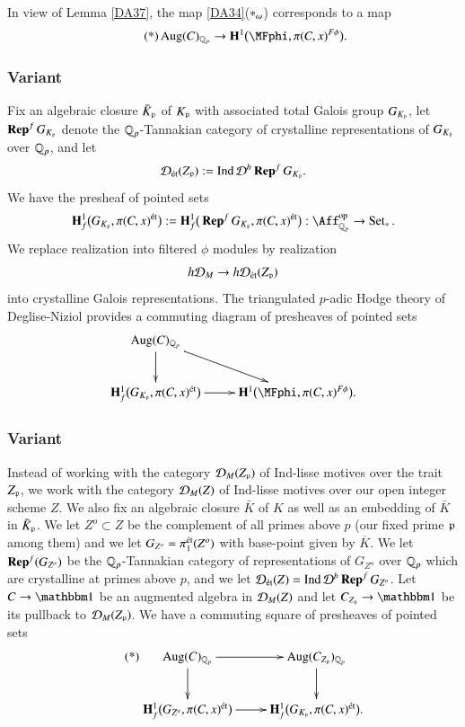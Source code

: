 \begin{ssRemark}
\label{DA38}
In view of Lemma \ref{DA37}, the map \ref{DA34}($\ast_\omega$) corresponds to a map
\[
\tag{*}
\Aug(C)_\Qp \to 
\mathbf{H}^1\big(\MFphi, \pi(C,x)^{F\phi} \big).
\]
\end{ssRemark}

\subsubsection{Variant}
\label{DA39}
Fix an algebraic closure $\bar K_{\mathfrak{p}}$ of $K_{\mathfrak{p}}$ with associated total Galois group $G_{K_{\mathfrak{p}}}$, let $\operatorname{\bf{Rep}}^f G_{K_{\mathfrak{p}}}$ denote the ${\mathbb{Q}_p}$-Tannakian category of crystalline representations of $G_{K_{\mathfrak{p}}}$ over ${\mathbb{Q}_p}$, and let
\[
\mathcal{D}_{\textrm {\'et}}(Z_{\mathfrak{p}}) := \operatorname{Ind} \mathcal{D}^b \operatorname{\bf{Rep}}^f G_{K_{\mathfrak{p}}}.
\]
We have the presheaf of pointed sets
\[
\mathbf{H}^1_f \big( 
G_{K_\pP}, \pi(C,x)^\et
\big):=
\mathbf{H}^1_f \big( 
\Rep^f G_{K_\pP}, \pi(C,x)^\et
\big):
\Aff_{\Qp}\op \to \Set_*.
\]
We replace realization into filtered $\phi$ modules by realization
\[
h\mathcal{D}_M \to h \mathcal{D}_{\textrm {\'et}}(Z_{\mathfrak{p}})
\]
into crystalline Galois representations. The triangulated $p$-adic Hodge theory of Deglise-Niziol \cite{DegliseNiziol} provides a commuting diagram of presheaves of pointed sets
\[
\xymatrix{
\Aug(C)_\Qp \ar[d] \ar[dr] \\
\mathbf{H}^1_f \big( 
G_{K_\pP}, \pi(C,x)^\et
\big)
\ar[r]
&
\mathbf{H}^1\big(\MFphi,  \pi(C,x)^{F\phi} \big).
}
\]

\subsubsection{Variant}
\label{DA41}
Instead of working with the category $\mathcal{D}_M(Z_{\mathfrak{p}})$ of Ind-lisse motives over the trait $Z_{\mathfrak{p}}$, we work with the category $\mathcal{D}_M(Z)$ of Ind-lisse motives over our open integer scheme $Z$. We also fix an algebraic closure $\bar K$ of $K$ as well as an embedding of $\bar K$ in $\bar K_{\mathfrak{p}}$. We let $Z^o \subset Z$ be the complement of all primes above $p$ (our fixed prime $\mathfrak{p}$ among them) and we let $G_{Z^o} = \pi_1^{\textrm {\'et}}(Z^o)$ with base-point given by $\overline K$. We let $\operatorname{\bf{Rep}}^f(G_{Z^o})$ be the ${\mathbb{Q}_p}$-Tannakian category of representations of $G_{Z^o}$ over ${\mathbb{Q}_p}$ which are crystalline at primes above $p$, and we let $\mathcal{D}_{{\textrm {\'et}}}(Z) = \operatorname{Ind} \mathcal{D}^b \operatorname{\bf{Rep}}^f G_{Z^o}$. Let $C \to \one$ be an augmented algebra in $\mathcal{D}_M(Z)$ and let $C_{Z_\pP} \to \one$ be its pullback to $\mathcal{D}_M(Z_{\mathfrak{p}})$. We have a commuting square of presheaves of pointed sets
\[
\tag{*}
\xymatrix{
\Aug(C)_\Qp \ar[r] \ar[d] & \Aug(C_{Z_\pP})_\Qp \ar[d]
\\
\mathbf{H}^1_f \big( 
G_{Z^o}, \pi(C,x)^\et
\big)
\ar[r]
&
\mathbf{H}^1_f \big( 
G_{K_\pP}, \pi(C,x)^\et
\big).
}
\]

